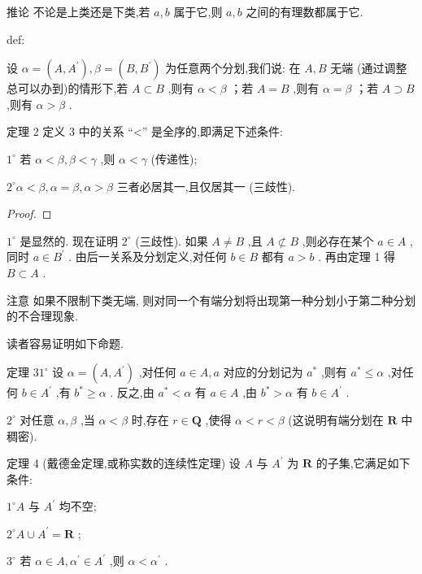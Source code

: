 推论 不论是上类还是下类,若 \(a,b\) 属于它,则 \(a,b\) 之间的有理数都属于它.

\begin{definition}{}{def:}

\end{definition}
设 \(\alpha  = \left( {A,{A}^{\prime }}\right) ,\beta  = \left( {B,{B}^{\prime }}\right)\) 为任意两个分划,我们说: 在 \(A,B\) 无端 (通过调整总可以办到)的情形下,若 \(A \subset  B\) ,则有 \(\alpha  < \beta\) ；若 \(A = B\) ,则有 \(\alpha  = \beta\) ；若 \(A \supset  B\) ,则有 \(\alpha  > \beta\) .

定理 2 定义 3 中的关系 “<” 是全序的,即满足下述条件:

\({1}^{ \circ  }\) 若 \(\alpha  < \beta ,\beta  < \gamma\) ,则 \(\alpha  < \gamma\) (传递性);

\({2}^{ \circ  }\alpha  < \beta ,\alpha  = \beta ,\alpha  > \beta\) 三者必居其一,且仅居其一 (三歧性).

\begin{proof}

\end{proof}
\({1}^{ \circ  }\) 是显然的. 现在证明 \({2}^{ \circ  }\) (三歧性). 如果 \(A \neq  B\) ,且 \(A ⊄ B\) ,则必存在某个 \(a \in  A\) , 同时 \(a \in  {B}^{\prime }\) . 由后一关系及分划定义,对任何 \(b \in  B\) 都有 \(a > b\) . 再由定理 1 得 \(B \subset  A\) .

注意 如果不限制下类无端, 则对同一个有端分划将出现第一种分划小于第二种分划的不合理现象.

读者容易证明如下命题.

定理 \({31}^{ \circ  }\) 设 \(\alpha  = \left( {A,{A}^{\prime }}\right)\) ,对任何 \(a \in  A,a\) 对应的分划记为 \({a}^{ * }\) ,则有 \({a}^{ * } \leq  \alpha\) ,对任何 \(b \in  {A}^{\prime }\) ,有 \({b}^{ * } \geq  \alpha\) . 反之,由 \({a}^{ * } < \alpha\) 有 \(a \in  A\) ,由 \({b}^{ * } > \alpha\) 有 \(b \in  {A}^{\prime }\) .

\({2}^{ \circ  }\) 对任意 \(\alpha ,\beta\) ,当 \(\alpha  < \beta\) 时,存在 \(r \in  \mathbf{Q}\) ,使得 \(\alpha  < r < \beta\) (这说明有端分划在 \(\mathbf{R}\) 中稠密).

定理 4 (戴德金定理,或称实数的连续性定理) 设 \(A\) 与 \({A}^{\prime }\) 为 \(\mathbf{R}\) 的子集,它满足如下条件:

\({1}^{ \circ  }A\) 与 \({A}^{\prime }\) 均不空;

\({2}^{ \circ  }A \cup  {A}^{\prime } = \mathbf{R}\) ;

\({3}^{ \circ  }\) 若 \(\alpha  \in  A,{\alpha }^{\prime } \in  {A}^{\prime }\) ,则 \(\alpha  < {\alpha }^{\prime }\) .

